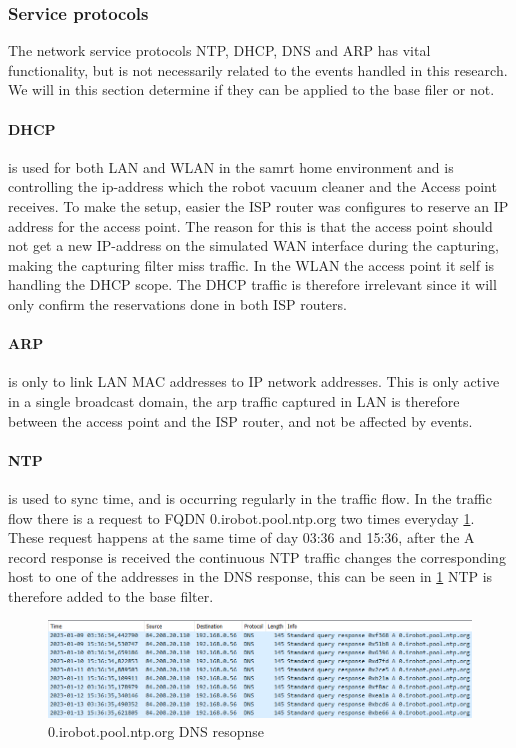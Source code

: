 \subsubsection{Service protocols}
The network service protocols NTP, DHCP, DNS and ARP has vital functionality, but is not necessarily related to the events handled in this research. We will in this section determine if they can be applied to the base filer or not. 

\paragraph{DHCP} is used for both LAN and WLAN in the samrt home environment and is controlling the ip-address which the robot vacuum cleaner and the Access point receives. To make the setup, easier the ISP router was configures to reserve an IP address for the access point. The reason for this is that the access point should not get a new IP-address on the simulated WAN interface during the capturing, making the capturing filter miss traffic. In the WLAN the access point it self is handling the DHCP scope. The DHCP traffic is therefore irrelevant since it will only confirm the reservations done in both ISP routers.

\paragraph{ARP} is only to link LAN MAC addresses to IP network addresses. This is only active in a single broadcast domain, the arp traffic captured in LAN is therefore between the access point and the ISP router, and not be affected by events. 

\paragraph{NTP} is used to sync time, and is occurring regularly in the traffic flow. In the traffic flow there is a request to FQDN 0.irobot.pool.ntp.org two times everyday \ref{fig:ntp_dns}. These request happens at the same time of day 03:36 and 15:36, after the A record response is received the continuous NTP traffic changes the corresponding host to one of the addresses in the DNS response, this can be seen in \ref{fig:ntp_dns} NTP is therefore added to the base filter.

\begin{figure}[H]
    \centering
    \includegraphics[width=\textwidth]{figures/NTP_wireshark .png}
    \caption{0.irobot.pool.ntp.org DNS resopnse}
    \label{fig:ntp_dns}
\end{figure}

